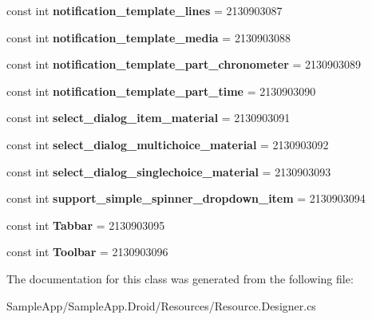 \begin{DoxyCompactItemize}
\mbox{\label{class_sample_app_1_1_droid_1_1_resource_1_1_layout_a5bc21054f18c105c0de2c10960f0761b}} 
const int {\bfseries notification\+\_\+template\+\_\+lines} = 2130903087
\item 
\mbox{\label{class_sample_app_1_1_droid_1_1_resource_1_1_layout_afe9dc379967b1fff5c60eac2e8e44abc}} 
const int {\bfseries notification\+\_\+template\+\_\+media} = 2130903088
\item 
\mbox{\label{class_sample_app_1_1_droid_1_1_resource_1_1_layout_a7a8edc5ca95719d81e413bbcb3b591bb}} 
const int {\bfseries notification\+\_\+template\+\_\+part\+\_\+chronometer} = 2130903089
\item 
\mbox{\label{class_sample_app_1_1_droid_1_1_resource_1_1_layout_a56a8a1be7b62c5901b63b4cc1864948e}} 
const int {\bfseries notification\+\_\+template\+\_\+part\+\_\+time} = 2130903090
\item 
\mbox{\label{class_sample_app_1_1_droid_1_1_resource_1_1_layout_a0cfd5eca444b0191a5efa5445b84303a}} 
const int {\bfseries select\+\_\+dialog\+\_\+item\+\_\+material} = 2130903091
\item 
\mbox{\label{class_sample_app_1_1_droid_1_1_resource_1_1_layout_a716c7255b312bf531dde1e0dd059da13}} 
const int {\bfseries select\+\_\+dialog\+\_\+multichoice\+\_\+material} = 2130903092
\item 
\mbox{\label{class_sample_app_1_1_droid_1_1_resource_1_1_layout_a67d7adfefa8d09ecddb4022dd89cfe43}} 
const int {\bfseries select\+\_\+dialog\+\_\+singlechoice\+\_\+material} = 2130903093
\item 
\mbox{\label{class_sample_app_1_1_droid_1_1_resource_1_1_layout_afc7430bcd0acf6c37e2bdf2590bd408e}} 
const int {\bfseries support\+\_\+simple\+\_\+spinner\+\_\+dropdown\+\_\+item} = 2130903094
\item 
\mbox{\label{class_sample_app_1_1_droid_1_1_resource_1_1_layout_a73a345b33fc13bec0a9da2410d63e1cc}} 
const int {\bfseries Tabbar} = 2130903095
\item 
\mbox{\label{class_sample_app_1_1_droid_1_1_resource_1_1_layout_ad05e2178da8fb4d1974214ce50e05655}} 
const int {\bfseries Toolbar} = 2130903096
\end{DoxyCompactItemize}


The documentation for this class was generated from the following file\+:\begin{DoxyCompactItemize}
\item 
Sample\+App/\+Sample\+App.\+Droid/\+Resources/Resource.\+Designer.\+cs\end{DoxyCompactItemize}
